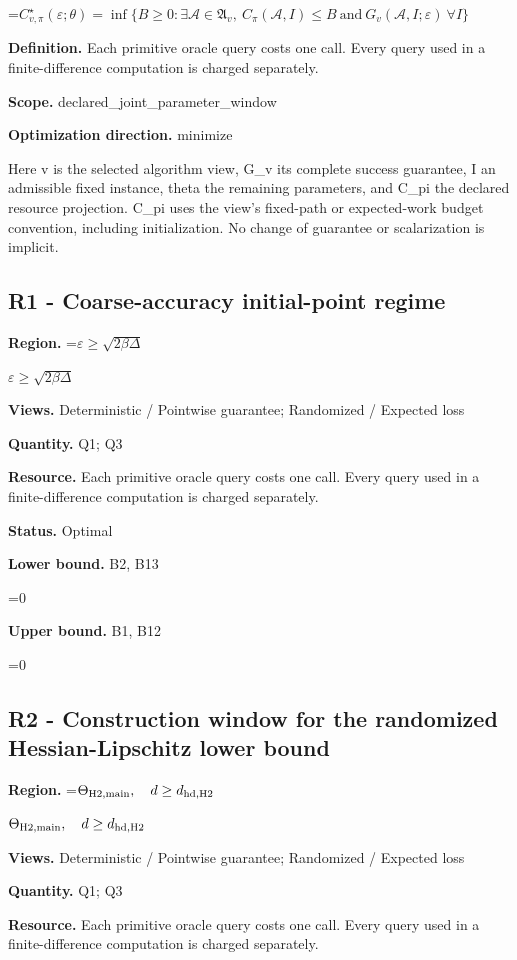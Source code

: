 \documentclass[10pt,a4paper]{article}
\newcommand{\AtlasMath}[1]{\par\begingroup\centering\setbox0=\hbox{$\displaystyle #1$}\ifdim\wd0>1.4\linewidth\typeout{ATLAS WIDE FORMULA: \the\wd0}\fi\ifdim\wd0>\linewidth\resizebox{\linewidth}{!}{\box0}\else\box0\fi\par\endgroup}
\newcommand{\AtlasInlineMath}[1]{\begingroup\setbox0=\hbox{$#1$}\ifdim\wd0>.4\linewidth\endgroup\AtlasMath{#1}\else\endgroup$#1$\fi}
\begin{document}
\AtlasMath{C^\star_{v,\pi}(\varepsilon;\theta)=\inf\{B\ge0:\exists\mathcal A\in\mathfrak A_v,\ C_\pi(\mathcal A,I)\le B\ \text{and}\ G_v(\mathcal A,I;\varepsilon)\ \forall I\}}
\textbf{Definition.} Each primitive oracle query costs one call. Every query used in a finite-difference computation is charged separately.

\textbf{Scope.} declared\_joint\_parameter\_window

\textbf{Optimization direction.} minimize

Here v is the selected algorithm view, G\_v its complete success guarantee, I an admissible fixed instance, theta the remaining parameters, and C\_pi the declared resource projection. C\_pi uses the view's fixed-path or expected-work budget convention, including initialization. No change of guarantee or scalarization is implicit.

\subsection{R1 - Coarse-accuracy initial-point regime}
\textbf{Region.} \AtlasInlineMath{\varepsilon\ge\sqrt{2\beta\Delta}}

\textbf{Views.} Deterministic / Pointwise guarantee; Randomized / Expected loss

\textbf{Quantity.} Q1; Q3

\textbf{Resource.} Each primitive oracle query costs one call. Every query used in a finite-difference computation is charged separately.

\textbf{Status.} Optimal

\textbf{Lower bound.} B2, B13

\AtlasMath{0}
\textbf{Upper bound.} B1, B12

\AtlasMath{0}
\subsection{R2 - Construction window for the randomized Hessian-Lipschitz lower bound}
\textbf{Region.} \AtlasInlineMath{\Theta_{\rm H2,main},\quad d\ge d_{\rm hd,H2}}

\textbf{Views.} Deterministic / Pointwise guarantee; Randomized / Expected loss

\textbf{Quantity.} Q1; Q3

\textbf{Resource.} Each primitive oracle query costs one call. Every query used in a finite-difference computation is charged separately.
\end{document}
